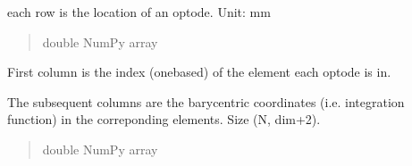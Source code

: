 \documentclass[letterpaper,10pt,english]{sphinxmanual}
\begin{document}
\begin{fulllineitems}
\begin{fulllineitems}
\begin{quote}
\begin{description}
\end{description}\end{quote}

\end{fulllineitems}


\begin{fulllineitems}
\label{\detokenize{_autosummary/nirfasterff.base.optodes.optode:nirfasterff.base.optodes.optode.coord}}
\pysigstartsignatures
{}
\pysigstopsignatures
\sphinxAtStartPar
each row is the location of an optode. Unit: mm
\begin{quote}\begin{description}
\sphinxAtStartPar
double NumPy array

\end{description}\end{quote}

\end{fulllineitems}


\begin{fulllineitems}
\label{\detokenize{_autosummary/nirfasterff.base.optodes.optode:nirfasterff.base.optodes.optode.int_func}}
\pysigstartsignatures
{}
\pysigstopsignatures
\sphinxAtStartPar
First column is the index (one\sphinxhyphen{}based) of the element each optode is in.

\sphinxAtStartPar
The subsequent columns are the barycentric coordinates (i.e. integration function) in the correponding elements. Size (N, dim+2).
\begin{quote}\begin{description}
\sphinxAtStartPar
double NumPy array

\end{description}\end{quote}

\end{fulllineitems}



\end{fulllineitems}
\end{document}
